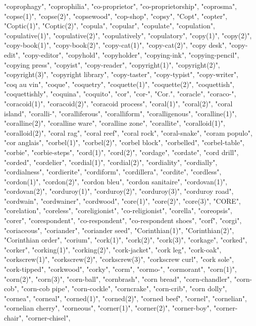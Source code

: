 "coprophagy",
"coprophilia",
"co-proprietor",
"co-proprietorship",
"coprosma",
"copse(1)",
"copse(2)",
"copsewood",
"cop-shop",
"copsy",
"Copt",
"copter",
"Coptic(1)",
"Coptic(2)",
"copula",
"copular",
"copulate",
"copulation",
"copulative(1)",
"copulative(2)",
"copulatively",
"copulatory",
"copy(1)",
"copy(2)",
"copy-book(1)",
"copy-book(2)",
"copy-cat(1)",
"copy-cat(2)",
"copy desk",
"copy-edit",
"copy-editor",
"copyhold",
"copyholder",
"copying-ink",
"copying-pencil",
"copying press",
"copyist",
"copy-reader",
"copyright(1)",
"copyright(2)",
"copyright(3)",
"copyright library",
"copy-taster",
"copy-typist",
"copy-writer",
"coq au vin",
"coque",
"coquetry",
"coquette(1)",
"coquette(2)",
"coquettish",
"coquettishly",
"coquina",
"coquito",
"cor",
"cor-",
"Cor.",
"coracle",
"coraco-",
"coracoid(1)",
"coracoid(2)",
"coracoid process",
"coral(1)",
"coral(2)",
"coral island",
"coralli-",
"coralliferous",
"coralliform",
"coralligenous",
"coralline(1)",
"coralline(2)",
"coralline ware",
"coralline zone",
"corallite",
"coralloid(1)",
"coralloid(2)",
"coral rag",
"coral reef",
"coral rock",
"coral-snake",
"coram populo",
"cor anglais",
"corbel(1)",
"corbel(2)",
"corbel block",
"corbelled",
"corbel-table",
"corbie",
"corbie-steps",
"cord(1)",
"cord(2)",
"cordage",
"cordate",
"cord drill",
"corded",
"cordelier",
"cordial(1)",
"cordial(2)",
"cordiality",
"cordially",
"cordialness",
"cordierite",
"cordiform",
"cordillera",
"cordite",
"cordless",
"cordon(1)",
"cordon(2)",
"cordon bleu",
"cordon sanitaire",
"cordovan(1)",
"cordovan(2)",
"corduroy(1)",
"corduroy(2)",
"corduroy(3)",
"corduroy road",
"cordwain",
"cordwainer",
"cordwood",
"core(1)",
"core(2)",
"core(3)",
"CORE",
"corelation",
"coreless",
"coreligionist",
"co-religionist",
"corella",
"coreopsis",
"corer",
"corespondent",
"co-respondent",
"co-respondent shoes",
"corf",
"corgi",
"coriaceous",
"coriander",
"coriander seed",
"Corinthian(1)",
"Corinthian(2)",
"Corinthian order",
"corium",
"cork(1)",
"cork(2)",
"cork(3)",
"corkage",
"corked",
"corker",
"corking(1)",
"corking(2)",
"cork-jacket",
"cork leg",
"cork-oak",
"corkscrew(1)",
"corkscrew(2)",
"corkscrew(3)",
"corkscrew curl",
"cork sole",
"cork-tipped",
"corkwood",
"corky",
"corm",
"cormo-",
"cormorant",
"corn(1)",
"corn(2)",
"corn(3)",
"corn-ball",
"cornbrash",
"corn bread",
"corn-chandler",
"corn-cob",
"corn-cob pipe",
"corn-cockle",
"corncrake",
"corn-crib",
"corn dolly",
"cornea",
"corneal",
"corned(1)",
"corned(2)",
"corned beef",
"cornel",
"cornelian",
"cornelian cherry",
"corneous",
"corner(1)",
"corner(2)",
"corner-boy",
"corner-chair",
"corner-chisel",
